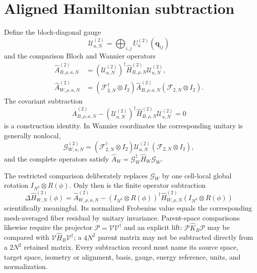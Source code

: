 \documentclass[11pt]{article}
\begin{document}
\section{Aligned Hamiltonian subtraction}

Define the block-diagonal gauge
\begin{equation}
 \mathcal U_{a,N}^{(2)}=\bigoplus_{i,j}U_a^{(2)}(\mathbf q_{ij})
\end{equation}
and the comparison Bloch and Wannier operators
\begin{align}
 \widehat A_{B,\rho,a,N}^{(2)}
 &=(\mathcal U_{a,N}^{(2)})^\dagger
   \widehat H_{B,\rho,N}^{(2)}\mathcal U_{a,N}^{(2)},\\
 \widehat A_{W,\rho,a,N}^{(2)}
 &=(\mathcal F_{2,N}^\dagger\otimes I_2)
   \widehat A_{B,\rho,a,N}^{(2)}
   (\mathcal F_{2,N}\otimes I_2).
\end{align}
The covariant subtraction
\begin{equation}
 \widehat A_{B,\rho,a,N}^{(2)}
 -(\mathcal U_{a,N}^{(2)})^\dagger
   \widehat H_{B,\rho,N}^{(2)}\mathcal U_{a,N}^{(2)}
 =0
 \label{eq:covariant-zero}
\end{equation}
is a construction identity. In Wannier coordinates the corresponding unitary is
generally nonlocal,
\begin{equation}
 \mathcal G_{W,a,N}^{(2)}
 =(\mathcal F_{2,N}^\dagger\otimes I_2)
  \mathcal U_{a,N}^{(2)}
 (\mathcal F_{2,N}\otimes I_2),
\end{equation}
and the complete operators satisfy
$\widehat A_W=\mathcal G_W^\dagger\widehat H_W\mathcal G_W$.

The restricted comparison deliberately replaces $\mathcal G_W$ by one cell-local global
rotation $I_{N^2}\otimes R(\phi)$. Only then is the finite operator subtraction
\begin{equation}
 \Delta\widehat H_{W,N}^{(2)}(\phi)
 =\widehat A_{W,\rho,a,N}^{(2)}
 -(I_{N^2}\otimes R(\phi))^\dagger
  \widehat H_{W,\rho,N}^{(2)}
  (I_{N^2}\otimes R(\phi))
 \label{eq:restricted-subtraction}
\end{equation}
scientifically meaningful. Its normalized Frobenius value equals the corresponding
mesh-averaged fiber residual by unitary invariance. Parent-space comparisons likewise
require the projector $\mathcal P=\mathcal V\mathcal V^\dagger$ and an explicit lift:
$\mathcal P\widehat K_B\mathcal P$ may be compared with
$\mathcal V\widehat H_B\mathcal V^\dagger$; a $4N^2$ parent matrix may not be subtracted
directly from a $2N^2$ retained matrix. Every subtraction record must name its source
space, target space, isometry or alignment, basis, gauge, energy reference, units, and
normalization.
\end{document}

